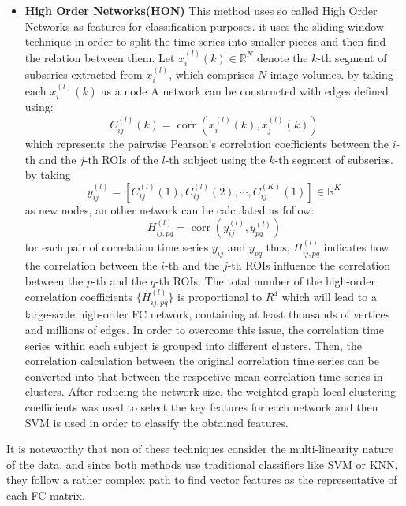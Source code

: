 \documentclass[journal]{IEEEtran}
\begin{document}
\begin{itemize}
		\item \textbf{High Order Networks(HON)}
		This method uses so called High Order Networks as features for classification purposes. it uses the sliding window technique in order to split the time-series into smaller pieces and then find the relation between them. Let $x_{i}^{(l)}(k) \in \mathbb{R}^N$ denote the $k$-th segment of subseries extracted from $x_{i}^{(l)}$, which comprises $N$ image volumes. by taking each $x_{i}^{(l)}(k)$ as a node A network can be constructed with edges defined using:
		\[
		C_{ij}^{(l)}(k) = \operatorname{corr}\left(x_{i}^{(l)}(k),x_{j}^{(l)}(k)
		\right)
		\]
		which represents the pairwise Pearson’s correlation coefficients
		between the $i$-th and the $j$-th ROIs of the $l$-th subject using the $k$-th segment of subseries. 
		by taking  
		\[
		y_{ij}^{(l)} = \left[ 
		C_{ij}^{(l)}(1), C_{ij}^{(l)}(2), \cdots , C_{ij}^{(K)}(1) 
		\right] \in \mathbb{R}^K
		\]
		as new nodes, an other network can be calculated as follow: 
		\[
		H_{ij,pq}^{(l)} = \operatorname{corr} \left(
		y_{ij}^{(l)},y_{pq}^{(l)}
		\right)
		\]
		for each pair of correlation time series $y_{ij}$ and $y_{pq}$ thus, $H_{ij,pq}^{(l)}$ indicates how the correlation between the $i$-th and the $j$-th ROIs influence the correlation between the $p$-th and the $q$-th ROIs.
		The total number of the high-order correlation coefficients
		$\{ H_{ij,pq}^{(l)} \}$ is proportional to $R^4$ which will lead to a large-scale high-order FC
		network, containing at least thousands of vertices and millions
		of edges. In order to overcome this issue, the correlation time series within each subject is grouped into different clusters. Then, the correlation calculation
		between the original correlation time series can be
		converted into that between the respective mean correlation
		time series in clusters. After reducing the network size, the
		weighted-graph local clustering coefficients was used to select the key features for each network and then SVM is used in order to classify the obtained features.  
	\end{itemize}
	
	It is noteworthy that non of these techniques consider the multi-linearity nature of the data, and since both methods use traditional classifiers like SVM or KNN, they follow a rather complex path to find vector features as the representative of each FC matrix.
	
	
\end{document}

